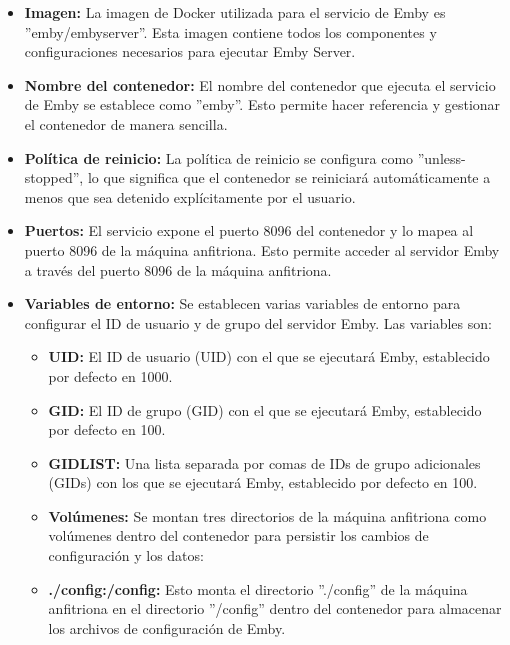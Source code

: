 		\begin{itemize}
		
		\item \textbf{Imagen:} La imagen de Docker utilizada para el servicio de Emby es ''emby/embyserver''. Esta imagen contiene todos los componentes y configuraciones necesarios para ejecutar Emby Server.
	
		\item \textbf{Nombre del contenedor:} El nombre del contenedor que ejecuta el servicio de Emby se establece como ''emby''. Esto permite hacer referencia y gestionar el contenedor de manera sencilla.
	
		\item \textbf{Política de reinicio:} La política de reinicio se configura como ''unless-stopped'', lo que significa que el contenedor se reiniciará automáticamente a menos que sea detenido explícitamente por el usuario.
	
		\item  \textbf{Puertos:} El servicio expone el puerto 8096 del contenedor y lo mapea al puerto 8096 de la máquina anfitriona. Esto permite acceder al servidor Emby a través del puerto 8096 de la máquina anfitriona.
	
		\item  \textbf{Variables de entorno:} Se establecen varias variables de entorno para configurar el ID de usuario y de grupo del servidor Emby. Las variables son:
		
		\begin{itemize}
		
			\item \textbf{UID:} El ID de usuario (UID) con el que se ejecutará Emby, establecido por defecto en 1000.
		
			\item \textbf{GID:} El ID de grupo (GID) con el que se ejecutará Emby, establecido por defecto en 100.
		
			\item \textbf{GIDLIST:} Una lista separada por comas de IDs de grupo adicionales (GIDs) con los que se ejecutará Emby, establecido por defecto en 100.
			
			\item \textbf{Volúmenes:} Se montan tres directorios de la máquina anfitriona como volúmenes dentro del contenedor para persistir los cambios de configuración y los datos:
			
			\item \textbf{./config:/config:} Esto monta el directorio ''./config'' de la máquina anfitriona en el directorio ''/config'' dentro del contenedor para almacenar los archivos de configuración de Emby.
	

\end{itemize}
\end{itemize}
